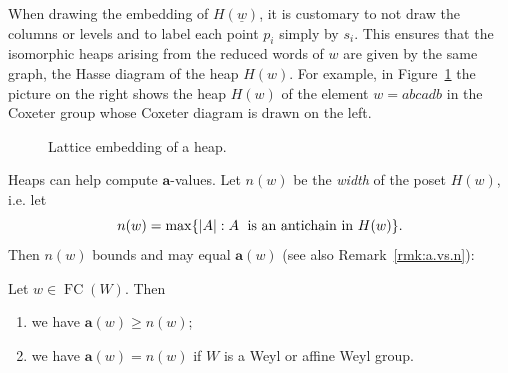 \documentclass[ALCO,Unicode,published]{cedram}
\newcommand{\la}{\mathbf{a}}
\newcommand{\abs}[1]{\lvert #1 \rvert}
\DeclareMathOperator{\fc}{\mathrm{FC}}
\begin{document}
When drawing the embedding of $H(\underline w)$, it is customary to not draw the columns or levels
and to label each point $p_i$ simply by $s_i$. This ensures that the isomorphic heaps arising from
the reduced words of $w$ are given by the same graph, the Hasse diagram of the heap $H(w)$. For
example, in Figure~\ref{fig:HeapExample} the picture on the right shows the heap $H(w)$ of the
element $w = abcadb$ in the Coxeter group whose Coxeter diagram is drawn on the left. 
\begin{figure} \centering
    \caption{Lattice embedding of a heap.}
    \label{fig:HeapExample}
\end{figure}

Heaps can help compute $\la$-values. Let $n(w)$ be the  \emph{width} of the poset $H(w)$, i.e. let 
\[
    n(w)= \max\{\abs{A}:A \text{\; is an antichain in $H(w)$}\}.
\]
Then $n(w)$ bounds and may equal $\la(w)$ (see also Remark~\ref{rmk:a.vs.n}):

\begin{prop}\label{prop:a=n}
    Let $w\in \fc(W)$. Then
    \begin{enumerate}
        \item we have $\la(w)\ge n(w)$;
        \item we have $\la(w)=n(w)$ if $W$ is a Weyl or affine Weyl group.
    \end{enumerate}
\end{prop}
\end{document}
